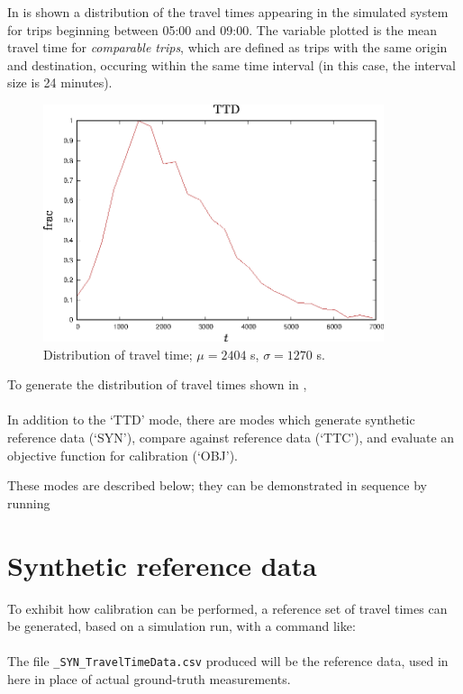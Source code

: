 In  is shown a distribution of the travel times
appearing in the simulated system for trips beginning between 05:00
and 09:00. The variable plotted is the mean travel time for
\emph{comparable trips}, which are defined as trips with the same
origin and destination, occuring within the same time interval (in
this case, the interval size is 24 minutes).
\begin{figure}[ht]
  \centering
  \includegraphics[angle=0,width=10cm]{80_figs/_TTD_0500-0900.eps}
  \caption{Distribution of travel time; $\mu=2404$ s, $\sigma=1270$ s.}
  \label{travtime}
\end{figure}
To generate the distribution of travel times shown in , \\
\\
In addition to the `TTD' mode, there are modes which generate synthetic
reference data (`SYN'), compare against reference data (`TTC'),
and evaluate an objective function for calibration (`OBJ').

These modes are described below; they can be demonstrated in sequence by running\\

\section{Synthetic reference data}
To exhibit how calibration can be performed, a reference set of travel
times can be generated, based on a simulation run, with a command like:\\
 \\
The file {\tt \_SYN\_TravelTimeData.csv} produced will be the reference data,
used in here in place of actual ground-truth measurements.

